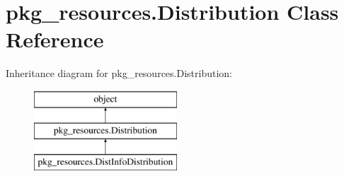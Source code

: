 \hypertarget{classpkg__resources_1_1Distribution}{}\section{pkg\+\_\+resources.\+Distribution Class Reference}
\label{classpkg__resources_1_1Distribution}
Inheritance diagram for pkg\+\_\+resources.\+Distribution\+:\begin{figure}[H]
\begin{center}
\leavevmode
\includegraphics[height=3.000000cm]{classpkg__resources_1_1Distribution}
\end{center}
\end{figure}
